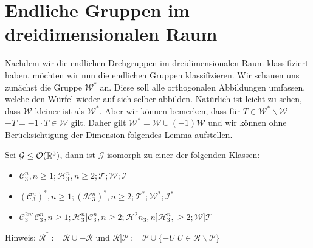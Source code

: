 \section{Endliche Gruppen im dreidimensionalen Raum} 
Nachdem wir die endlichen Drehgruppen im dreidimensionalen Raum klassifiziert haben, möchten wir nun die endlichen Gruppen klassifizieren. Wir schauen uns zunächst die Gruppe $\mathcal{W}^*$ an. Diese soll alle orthogonalen Abbildungen umfassen, welche den Würfel wieder auf sich selber abbilden. Natürlich ist leicht zu sehen, dass $\mathcal{W}$ kleiner ist als $\mathcal{W}^*$. Aber wir können bemerken, dass für $T \in \mathcal{W}^*\backslash\mathcal{W}$ \ $-T = -1 \cdot T \in \mathcal{W}$ gilt. Daher gilt $\mathcal{W}^*=\mathcal{W}\cup(-1)\mathcal{W}$ und wir können ohne Berücksichtigung der Dimension folgendes Lemma aufstellen.
\begin{theorem}
 Sei $\mathcal{G}\leq{\mathcal{O}(\mathbb{R}^3)}$, dann ist $\mathcal{G}$ isomorph zu einer der folgenden Klassen:
 \begin{itemize}
  \item $\mathcal{C}^n_3,n\geq1;\mathcal{H}^n_3,n\geq2;\mathcal{T};\mathcal{W};\mathcal{I}$
  \item $(\mathcal{C}^n_3)^*,n\geq1;(\mathcal{H}^n_3)^*,n\geq 2;\mathcal{T}^*;\mathcal{W}^*;\mathcal{I}^*$
  \item $\mathcal{C}^{2n}_3]\mathcal{C}^n_3,n\geq1;\mathcal{H}^n_3]\mathcal{C}^n_3,n\geq 2;\mathcal{H}^2n_3,n]\mathcal{H}^n_3,\geq2;\mathcal{W}]\mathcal{T}$
\end{itemize}
Hinweis: $\mathcal{R}^*:=\mathcal{R}\cup -\mathcal{R}$ und $\mathcal{R}]\mathcal{P}:=\mathcal{P}\cup \{-U|U\in \mathcal{R} \backslash \mathcal{P} \}$
\end{theorem}
